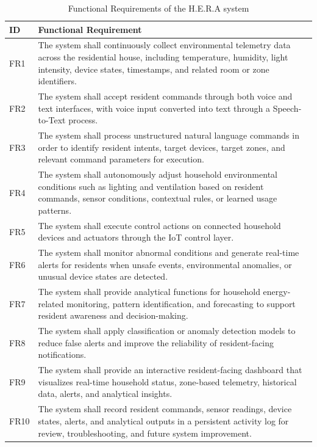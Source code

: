 \begin{table}[H]
	\centering
	\caption{Functional Requirements of the H.E.R.A system}
	\label{tab:functional_requirements}
	\renewcommand{\arraystretch}{1.2}
	\small
	\begin{tabularx}{\textwidth}{|>{\centering\arraybackslash}p{1.2cm}|X|}
		\hline
		\textbf{ID} & \textbf{Functional Requirement} \\
		\hline \hline
		FR1 & The system shall continuously collect environmental telemetry data across the residential house, including temperature, humidity, light intensity, device states, timestamps, and related room or zone identifiers. \\
		\hline
		FR2 & The system shall accept resident commands through both voice and text interfaces, with voice input converted into text through a Speech-to-Text process. \\
		\hline
		FR3 & The system shall process unstructured natural language commands in order to identify resident intents, target devices, target zones, and relevant command parameters for execution. \\
		\hline
		FR4 & The system shall autonomously adjust household environmental conditions such as lighting and ventilation based on resident commands, sensor conditions, contextual rules, or learned usage patterns. \\
		\hline
		FR5 & The system shall execute control actions on connected household devices and actuators through the IoT control layer. \\
		\hline
		FR6 & The system shall monitor abnormal conditions and generate real-time alerts for residents when unsafe events, environmental anomalies, or unusual device states are detected. \\
		\hline
		FR7 & The system shall provide analytical functions for household energy-related monitoring, pattern identification, and forecasting to support resident awareness and decision-making. \\
		\hline
		FR8 & The system shall apply classification or anomaly detection models to reduce false alerts and improve the reliability of resident-facing notifications. \\
		\hline
		FR9 & The system shall provide an interactive resident-facing dashboard that visualizes real-time household status, zone-based telemetry, historical data, alerts, and analytical insights. \\
		\hline
		FR10 & The system shall record resident commands, sensor readings, device states, alerts, and analytical outputs in a persistent activity log for review, troubleshooting, and future system improvement. \\
		\hline
	\end{tabularx}
\end{table}

